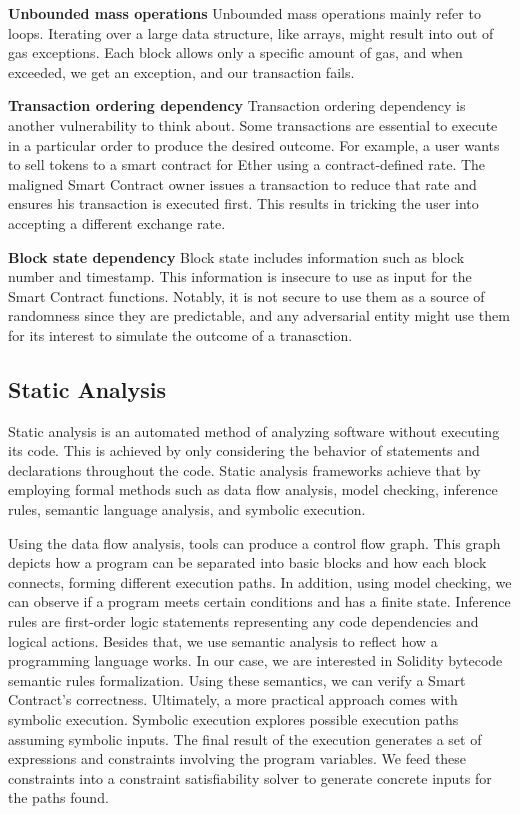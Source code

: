\documentclass[a4paper,11pt]{article}
\begin{document}
\textbf{Unbounded mass operations}
Unbounded mass operations mainly refer to loops. Iterating over a large data
structure, like arrays, might result into out of gas exceptions. Each block
allows only a specific amount of gas, and when exceeded, we get an exception,
and our transaction fails.

\textbf{Transaction ordering dependency}
Transaction ordering dependency is another vulnerability to think about. Some
transactions are essential to execute in a particular order to produce the
desired outcome. For example, a user wants to sell tokens to a smart contract
for Ether using a contract-defined rate. The maligned Smart Contract owner
issues a transaction to reduce that rate and ensures his transaction is executed
first. This results in tricking the user into accepting a different exchange
rate.

\textbf{Block state dependency}
Block state includes information such as block number and timestamp. This
information is insecure to use as input for the Smart Contract functions.
Notably, it is not secure to use them as a source of randomness since they are
predictable, and any adversarial entity might use them for its interest to
simulate the outcome of a tranasction.

\subsection{Static Analysis}

Static analysis is an automated method of analyzing software without executing
its code. This is achieved by only considering the behavior of statements and
declarations throughout the code. Static analysis frameworks achieve that by
employing formal methods such as data flow analysis, model checking, inference
rules, semantic language analysis, and symbolic execution. 

Using the data flow analysis, tools can produce a control flow graph. This graph
depicts how a program can be separated into basic blocks\cite{basicBlocks} and how each block
connects, forming different execution paths. In addition, using model checking,
we can observe if a program meets certain conditions and has a finite state.
Inference rules are first-order logic statements representing any code
dependencies and logical actions. Besides that, we use semantic analysis to
reflect how a programming language works. In our case, we are interested in
Solidity bytecode semantic rules formalization. Using these semantics, we can
verify a Smart Contract's correctness. Ultimately, a more practical approach
comes with symbolic execution. Symbolic execution explores possible execution
paths assuming symbolic inputs. The final result of the execution generates a
set of expressions and constraints involving the program variables. We feed
these constraints into a constraint satisfiability solver to generate concrete
inputs for the paths found.
\end{document}
